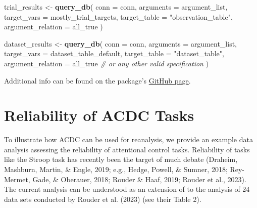 \documentclass[
  man,floatsintext]{apa6}
\newenvironment{Shaded}{\begin{snugshade}}{\end{snugshade}}
\newcommand{\AttributeTok}[1]{\textcolor[rgb]{0.13,0.29,0.53}{#1}}
\newcommand{\CommentTok}[1]{\textcolor[rgb]{0.56,0.35,0.01}{\textit{#1}}}
\newcommand{\FunctionTok}[1]{\textcolor[rgb]{0.13,0.29,0.53}{\textbf{#1}}}
\newcommand{\NormalTok}[1]{#1}
\newcommand{\OtherTok}[1]{\textcolor[rgb]{0.56,0.35,0.01}{#1}}
\newcommand{\StringTok}[1]{\textcolor[rgb]{0.31,0.60,0.02}{#1}}
\begin{document}
\begin{Shaded}
\begin{Highlighting}[]
\NormalTok{trial\_results }\OtherTok{\textless{}{-}} \FunctionTok{query\_db}\NormalTok{(}
  \AttributeTok{conn =}\NormalTok{ conn,}
  \AttributeTok{arguments =}\NormalTok{ argument\_list,}
  \AttributeTok{target\_vars =}\NormalTok{ mostly\_trial\_targets,}
  \AttributeTok{target\_table =} \StringTok{"observation\_table"}\NormalTok{,}
  \AttributeTok{argument\_relation =}\NormalTok{ all\_true}
\NormalTok{)}

\NormalTok{dataset\_results }\OtherTok{\textless{}{-}} \FunctionTok{query\_db}\NormalTok{(}
  \AttributeTok{conn =}\NormalTok{ conn,}
  \AttributeTok{arguments =}\NormalTok{ argument\_list,}
  \AttributeTok{target\_vars =}\NormalTok{ dataset\_table\_default, }
  \AttributeTok{target\_table =} \StringTok{"dataset\_table"}\NormalTok{,}
  \AttributeTok{argument\_relation =}\NormalTok{ all\_true }\CommentTok{\# or any other valid specification}
\NormalTok{)}
\end{Highlighting}
\end{Shaded}

Additional info can be found on the package's \href{https://github.com/SLesche/acdc-query}{GitHub page}.

\hypertarget{reliability-of-acdc-tasks}{%
\section{Reliability of ACDC Tasks}\label{reliability-of-acdc-tasks}}

To illustrate how ACDC can be used for reanalysis, we provide an example data analysis assessing the reliability of attentional control tasks. Reliability of tasks like the Stroop task has recently been the target of much debate (Draheim, Mashburn, Martin, \& Engle, 2019; e.g., Hedge, Powell, \& Sumner, 2018; Rey-Mermet, Gade, \& Oberauer, 2018; Rouder \& Haaf, 2019; Rouder et al., 2023). The current analysis can be understood as an extension of to the analysis of 24 data sets conducted by Rouder et al. (2023) (see their Table 2).
\end{document}
